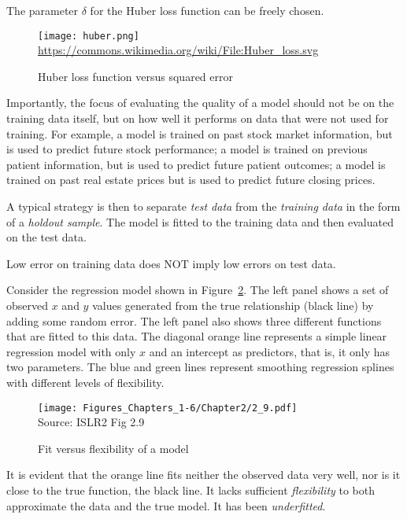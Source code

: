 \noindent The parameter $\delta$ for the Huber loss function can be freely chosen.

\begin{figure}
\centering
\texttt{[image: huber.png]}
\scriptsize \url{https://commons.wikimedia.org/wiki/File:Huber_loss.svg}
\caption{Huber loss function versus squared error}
\label{fig:huber}
\end{figure}

Importantly, the focus of evaluating the quality of a model should not be on the training data itself, but on how well it performs on data that were not used for training. For example, a model is trained on past stock market information, but is used to predict future stock performance; a model is trained on previous patient information, but is used to predict future patient outcomes; a model is trained on past real estate prices but is used to predict future closing prices. 

A typical strategy is then to separate \emph{test data} from the \emph{training data} in the form of a \emph{holdout sample}. The model is fitted to the training data and then evaluated on the test data.

\begin{alertbox}
Low error on training data does NOT imply low errors on test data.
\end{alertbox}

Consider the regression model shown in Figure~\ref{fig:freedom}. The left panel shows a set of observed $x$ and $y$ values generated from the true relationship (black line) by adding some random error. The left panel also shows three different functions that are fitted to this data. The diagonal orange line represents a simple linear regression model with only $x$ and an intercept as predictors, that is, it only has two parameters. The blue and green lines represent smoothing regression splines with different levels of flexibility.

\begin{figure}[b]
\centering
\texttt{[image: Figures\_Chapters\_1-6/Chapter2/2\_9.pdf]} \\

\scriptsize Source: ISLR2 Fig 2.9
\caption{Fit versus flexibility of a model}
\label{fig:freedom}
\end{figure}

It is evident that the orange line fits neither the observed data very well, nor is it close to the true function, the black line. It lacks sufficient \emph{flexibility} to both approximate the data and the true model. It has been \emph{underfitted}.

